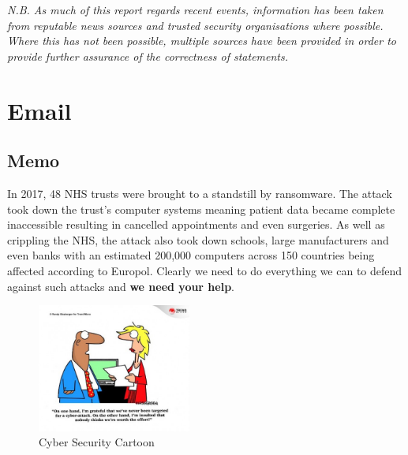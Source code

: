 \documentclass{article}
\begin{document}
\textit{N.B. As much of this report regards recent events, information has been taken from reputable news sources and trusted security organisations where possible.
Where this has not been possible, multiple sources have been provided in order to provide further assurance of the correctness of statements.}

\section{Email}
\subsection{Memo}%

In 2017, 48 NHS trusts were brought to a standstill by ransomware. The attack took down the trust's computer systems meaning patient data became complete inaccessible resulting in cancelled appointments and even surgeries\cite{wannacry_bbc}. As well as crippling the NHS, the attack also took down schools, large manufacturers and even banks with an estimated 200,000 computers across 150 countries being affected according to Europol\cite{wannacry_reuters}. Clearly we need to do everything we can to defend against such attacks and \textbf{we need your help}.

\begin{figure}
\includegraphics[width=0.45\textwidth]{Figures/Cartoon}
\caption{Cyber Security Cartoon\cite{cartoon}}
\label{Cartoon}
\end{figure}
\end{document}
